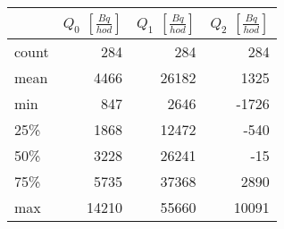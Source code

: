 \begin{tabular}{lrrr}
\toprule
{} &  $Q_0$ $\left[\si{\frac{Bq}{hod}}\right]$ &  $Q_1$ $\left[\si{\frac{Bq}{hod}}\right]$ &  $Q_2$ $\left[\si{\frac{Bq}{hod}}\right]$ \\
\midrule
count &                                       284 &                                       284 &                                       284 \\
mean  &                                      4466 &                                     26182 &                                      1325 \\
min   &                                       847 &                                      2646 &                                     -1726 \\
25\%   &                                      1868 &                                     12472 &                                      -540 \\
50\%   &                                      3228 &                                     26241 &                                       -15 \\
75\%   &                                      5735 &                                     37368 &                                      2890 \\
max   &                                     14210 &                                     55660 &                                     10091 \\
\bottomrule
\end{tabular}
